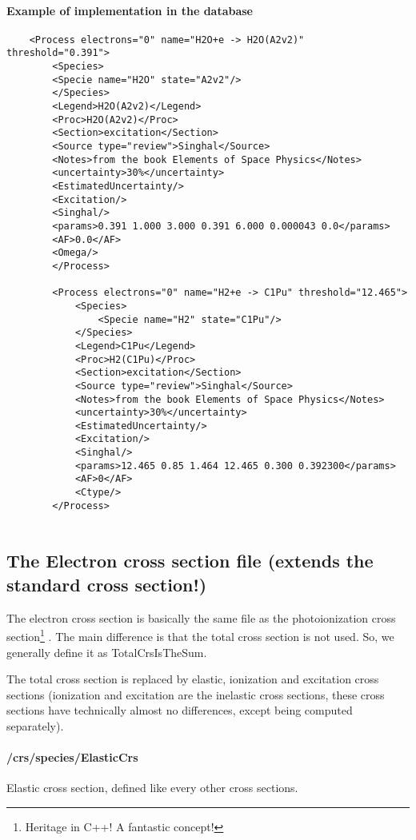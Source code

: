     




\paragraph{Example of implementation in the database}
\begin{verbatim}
	<Process electrons="0" name="H2O+e -> H2O(A2v2)" threshold="0.391">
	    <Species>
		<Specie name="H2O" state="A2v2"/>
	    </Species>
	    <Legend>H2O(A2v2)</Legend>
	    <Proc>H2O(A2v2)</Proc>
	    <Section>excitation</Section>
	    <Source type="review">Singhal</Source>
	    <Notes>from the book Elements of Space Physics</Notes>
	    <uncertainty>30%</uncertainty>
	    <EstimatedUncertainty/>
	    <Excitation/>
	    <Singhal/>
	    <params>0.391 1.000 3.000 0.391 6.000 0.000043 0.0</params>
	    <AF>0.0</AF>
	    <Omega/>
    	</Process>
	
		<Process electrons="0" name="H2+e -> C1Pu" threshold="12.465">
			<Species>
				<Specie name="H2" state="C1Pu"/>
			</Species>
			<Legend>C1Pu</Legend>
			<Proc>H2(C1Pu)</Proc>
			<Section>excitation</Section>
			<Source type="review">Singhal</Source>
			<Notes>from the book Elements of Space Physics</Notes>
			<uncertainty>30%</uncertainty>
			<EstimatedUncertainty/>
			<Excitation/>
			<Singhal/>
			<params>12.465 0.85 1.464 12.465 0.300 0.392300</params>
			<AF>0</AF>
			<Ctype/>
		</Process>
		
\end{verbatim}



\subsection{The Electron cross section file (extends the standard cross section!)}

The electron cross section is basically the same file as the photoionization cross section\footnote{Heritage in C++! A fantastic concept!} .
The main difference is that the total cross section is not used. So, we generally define it as TotalCrsIsTheSum.

The total cross section is replaced by elastic, ionization and excitation cross sections (ionization and excitation are the inelastic cross sections, these cross sections have technically almost no differences, except being computed separately).

\paragraph{/crs/species/ElasticCrs}
Elastic cross section, defined like every other cross sections.




